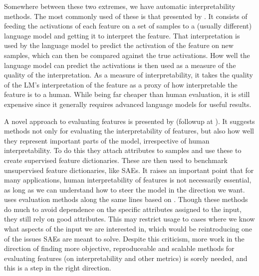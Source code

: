 Somewhere between these two extremes, we have automatic interpretability methods.
The most commonly used of these is that presented by \textcite{bills_language_2023}.
It consists of feeding the activations of each feature on a set of samples to a (usually different) language model and getting it to interpret the feature.
That interpretation is used by the language model to predict the activation of the feature on new samples, which can then be compared against the true activations.
How well the language model can predict the activations is then used as a measure of the quality of the interpretation.
As a measure of interpretability, it takes the quality of the LM's interpretation of the feature as a proxy of how interpretable the feature is to a human.
While being far cheaper than human evaluation, it is still expensive since it generally requires advanced language models for useful results.

A novel approach to evaluating features is presented by \textcite{makelov_towards_2024} (followup at \textcite{makelov_saes_2023}).
It suggests methods not only for evaluating the interpretability of features, but also how well they represent important parts of the model, irrespective of human interpretability.
To do this they attach attributes to samples and use these to create supervised feature dictionaries.
These are then used to benchmark unsupervised feature dictionaries, like SAEs.
It raises an important point that for many applications, human interpretability of features is not necessarily essential, as long as we can understand how to steer the model in the direction we want.
\textcite{huben_research_2024} uses evaluation methods along the same lines based on \textcite{li_emergent_2023}.
Though these methods do much to avoid dependence on the specific attributes assigned to the input, they still rely on good attributes.
This may restrict usage to cases where we know what aspects of the input we are interested in, which would be reintroducing one of the issues SAEs are meant to solve.
Despite this criticism, more work in the direction of finding more objective, reproduceable and scalable methods for evaluating features (on interpretability and other metrics) is sorely needed, and this is a step in the right direction.




